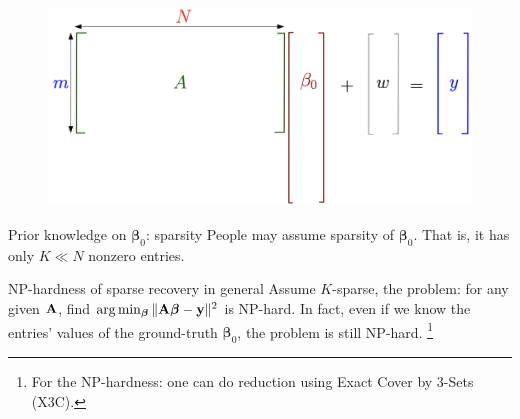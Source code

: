 \documentclass[aspectratio=43, 10pt]{beamer}
\begin{document}
\begin{frame}
    \vspace{-0.3cm}
    \begin{figure}
            \centering
        \includegraphics[width=0.7\linewidth]{figures/vis_formulation.png}
    \end{figure}

    \vspace{-0.2cm}
    \begin{block}{Prior knowledge on $\boldsymbol{\beta}_0$: sparsity}
        People may assume sparsity of $\boldsymbol{\beta}_0$. That is, it has only $K\ll N$ nonzero entries. 
    \end{block}

    \pause
    \begin{block}{NP-hardness of sparse recovery in general}
        Assume $K$-sparse, the problem: for any given $\bold{A}$, find $\arg\min_{\boldsymbol{\beta}} \| \bold{A}\boldsymbol{\beta} - \bold{y}  \|^2$ is NP-hard. In fact, even if we know the entries' values of the ground-truth $\boldsymbol{\beta}_0$, the problem is still NP-hard. \footnote{For the NP-hardness: one can do reduction using  Exact Cover by 3-Sets (X3C).}
    \end{block}
    
\end{frame}
\end{document}

